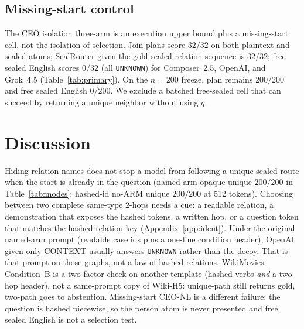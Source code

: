 \documentclass{article}
\begin{document}
\subsection{Missing-start control}
\label{sec:ceonl}

The CEO isolation three-arm is an execution upper bound plus a missing-start
cell, not the isolation of selection. Join plans score $32/32$ on both
plaintext and sealed atoms; SealRouter given the gold sealed relation
sequence is $32/32$; free sealed English scores $0/32$ (all
\texttt{UNKNOWN}) for Composer~2.5, OpenAI, and Grok~4.5
(Table~\ref{tab:primary}).
On the $n{=}200$ freeze, plan remains $200/200$ and free sealed English
$0/200$.
We exclude a batched free-sealed cell that can
succeed by returning a unique neighbor without using $q$.

\section{Discussion}

Hiding relation names does not stop a model from following a unique
sealed route when the start is already in the question
(named-arm opaque unique $200/200$ in Table~\ref{tab:modes};
hashed-id no-ARM unique $200/200$ at 512 tokens).
Choosing between two complete same-type 2-hops needs a cue: a readable
relation, a demonstration that exposes the hashed tokens, a written hop,
or a question token that matches the hashed relation key
(Appendix~\ref{app:ident}).
Under the original named-arm prompt (readable case ids plus a one-line
condition header), OpenAI given only CONTEXT usually answers
\texttt{UNKNOWN} rather than the decoy.
That is that prompt on those graphs, not a law of hashed relations.
WikiMovies Condition~B is a two-factor check on another template (hashed
verbs \emph{and} a two-hop header), not a same-prompt copy of Wiki-H5:
unique-path still returns gold, two-path goes to abstention.
Missing-start CEO-NL is a different failure: the question is hashed
piecewise, so the person atom is never presented and free sealed English
is not a selection test.
\end{document}
